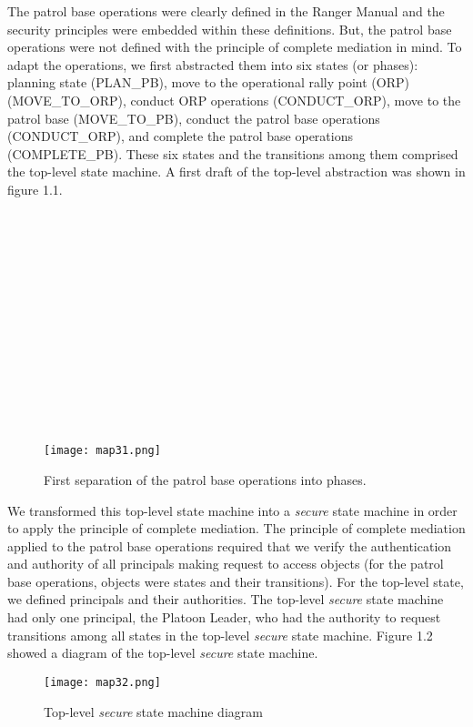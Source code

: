 The patrol base operations were clearly defined in the Ranger Manual \cite{rangerhandbook}  and the security principles
were embedded within these definitions.  But, the patrol base operations were not defined with the
principle of complete mediation in mind.  To adapt the operations, we first abstracted them into six
states (or phases): planning state (PLAN_PB), move to the operational rally point (ORP) (MOVE_TO_ORP),
conduct ORP operations (CONDUCT_ORP), move to the patrol base (MOVE_TO_PB), conduct the patrol base
operations (CONDUCT_ORP), and complete the patrol base operations (COMPLETE_PB).  These six states
and the transitions among them comprised the top-level state machine. A first draft of the top-level
abstraction was shown in figure 1.1.\\\\\\\\\\\\\\\\\\\\\\\\\\\\

\begin{figure}[h]
  \centering
  \texttt{[image: map31.png]}
  \caption{First separation of the patrol base operations into phases.}
\end{figure}

We transformed this top-level state machine into a \emph{secure} state machine in order to apply the
principle of complete mediation.  The principle of complete mediation applied to the patrol base
operations required that we verify the authentication and authority of all principals making request
to access objects (for the patrol base operations, objects were states and their transitions).
For the top-level state, we defined principals and their authorities.  The top-level \emph{secure}
state machine had only one principal, the Platoon Leader, who had the authority to request transitions
among all states in the top-level \emph{secure} state machine.   Figure 1.2 showed a diagram of the
top-level \emph{secure} state machine.

\begin{figure}[h]
  \centering
  \texttt{[image: map32.png]}
  \caption{Top-level \emph{secure} state machine diagram}
\end{figure}

